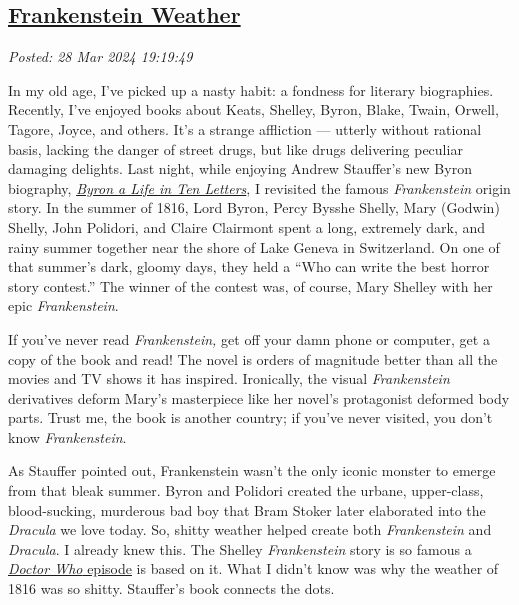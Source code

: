 %

\subsection*{\href{http://analyzethedatanotthedrivel.org/2024/03/28/frankenstein-weather/}{Frankenstein Weather}}


\noindent\emph{Posted: 28 Mar 2024 19:19:49}
\vspace{6pt}

In my old age, I've picked up a nasty habit: a fondness for literary
biographies. Recently, I've enjoyed books about Keats, Shelley, Byron,
Blake, Twain, Orwell, Tagore, Joyce, and others. It's a strange
affliction --- utterly without rational basis, lacking the danger of
street drugs, but like drugs delivering peculiar damaging delights. Last
night, while enjoying Andrew Stauffer's new Byron biography,
\href{https://www.amazon.com/Byron-Life-Letters-Andrew-Stauffer/dp/100920016X}{\emph{Byron
a Life in Ten Letters}}, I revisited the famous \emph{Frankenstein}
origin story. In the summer of 1816, Lord Byron, Percy Bysshe Shelly,
Mary (Godwin) Shelly, John Polidori, and Claire Clairmont spent a long,
extremely dark, and rainy summer together near the shore of Lake Geneva
in Switzerland. On one of that summer's dark, gloomy days, they held a
``Who can write the best horror story contest.'' The winner of the
contest was, of course, Mary Shelley with her epic \emph{Frankenstein}.

If you've never read \emph{Frankenstein,} get off your damn phone or
computer, get a copy of the book and read! The novel is orders of
magnitude better than all the movies and TV shows it has inspired.
Ironically, the visual \emph{Frankenstein} derivatives deform Mary's
masterpiece like her novel's protagonist deformed body parts. Trust me,
the book is another country; if you've never visited, you don't know
\emph{Frankenstein}.

As Stauffer pointed out, Frankenstein wasn't the only iconic monster to
emerge from that bleak summer. Byron and Polidori created the urbane,
upper-class, blood-sucking, murderous bad boy that Bram Stoker later
elaborated into the \emph{Dracula} we love today. So, shitty weather
helped create both \emph{Frankenstein} and \emph{Dracula}. I already
knew this. The Shelley \emph{Frankenstein} story is so famous a
\href{https://www.youtube.com/watch?v=Q8Tq5bfYudU}{\emph{Doctor Who}
episode} is based on it. What I didn't know was why the weather of 1816
was so shitty. Stauffer's book connects the dots.

